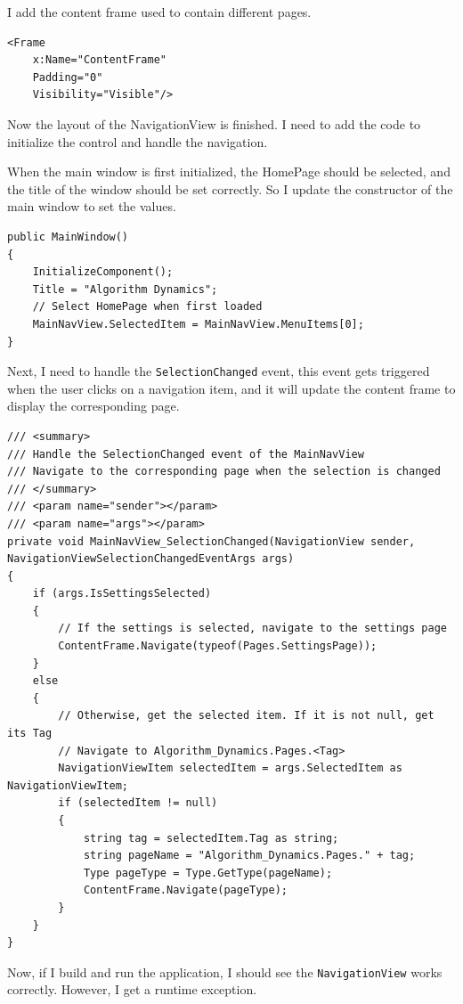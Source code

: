 \documentclass[a4paper]{report}
\begin{document}
I add the content frame used to contain different pages.

\begin{verbatim}
<Frame
    x:Name="ContentFrame"
    Padding="0"
    Visibility="Visible"/>
\end{verbatim}

Now the layout of the NavigationView is finished. I need to add the code to initialize the control and handle the navigation.

When the main window is first initialized, the HomePage should be selected, and the title of the window should be set correctly. So I update the constructor of the main window to set the values.

\begin{verbatim}
public MainWindow()
{
    InitializeComponent();
    Title = "Algorithm Dynamics";
    // Select HomePage when first loaded
    MainNavView.SelectedItem = MainNavView.MenuItems[0];
}
\end{verbatim}

Next, I need to handle the \texttt{SelectionChanged} event, this event gets triggered when the user clicks on a navigation item, and it will update the content frame to display the corresponding page.

\begin{verbatim}
/// <summary>
/// Handle the SelectionChanged event of the MainNavView
/// Navigate to the corresponding page when the selection is changed
/// </summary>
/// <param name="sender"></param>
/// <param name="args"></param>
private void MainNavView_SelectionChanged(NavigationView sender, NavigationViewSelectionChangedEventArgs args)
{
    if (args.IsSettingsSelected)
    {
        // If the settings is selected, navigate to the settings page
        ContentFrame.Navigate(typeof(Pages.SettingsPage));
    }
    else
    {
        // Otherwise, get the selected item. If it is not null, get its Tag
        // Navigate to Algorithm_Dynamics.Pages.<Tag>
        NavigationViewItem selectedItem = args.SelectedItem as NavigationViewItem;
        if (selectedItem != null)
        {
            string tag = selectedItem.Tag as string;
            string pageName = "Algorithm_Dynamics.Pages." + tag;
            Type pageType = Type.GetType(pageName);
            ContentFrame.Navigate(pageType);
        }
    }
}
\end{verbatim}


Now, if I build and run the application, I should see the \texttt{NavigationView} works correctly. However, I get a runtime exception.
\end{document}
